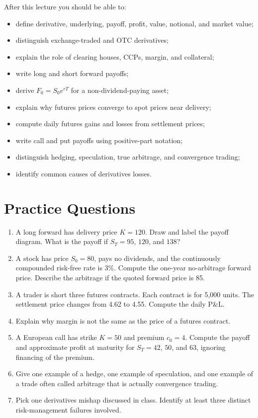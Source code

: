 After this lecture you should be able to:
\begin{itemize}
    \item define derivative, underlying, payoff, profit, value, notional, and
    market value;
    \item distinguish exchange-traded and OTC derivatives;
    \item explain the role of clearing houses, CCPs, margin, and collateral;
    \item write long and short forward payoffs;
    \item derive $F_0=S_0e^{rT}$ for a non-dividend-paying asset;
    \item explain why futures prices converge to spot prices near delivery;
    \item compute daily futures gains and losses from settlement prices;
    \item write call and put payoffs using positive-part notation;
    \item distinguish hedging, speculation, true arbitrage, and convergence
    trading;
    \item identify common causes of derivatives losses.
\end{itemize}

\section{Practice Questions}

\begin{enumerate}
    \item A long forward has delivery price $K=120$. Draw and label the payoff
    diagram. What is the payoff if $S_T=95$, $120$, and $138$?
    \item A stock has price $S_0=80$, pays no dividends, and the continuously
    compounded risk-free rate is 3\%. Compute the one-year no-arbitrage forward
    price. Describe the arbitrage if the quoted forward price is 85.
    \item A trader is short three futures contracts. Each contract is for 5,000
    units. The settlement price changes from 4.62 to 4.55. Compute the daily
    P\&L.
    \item Explain why margin is not the same as the price of a futures contract.
    \item A European call has strike $K=50$ and premium $c_0=4$. Compute the
    payoff and approximate profit at maturity for $S_T=42$, $50$, and $63$,
    ignoring financing of the premium.
    \item Give one example of a hedge, one example of speculation, and one
    example of a trade often called arbitrage that is actually convergence
    trading.
    \item Pick one derivatives mishap discussed in class. Identify at least
    three distinct risk-management failures involved.
\end{enumerate}


